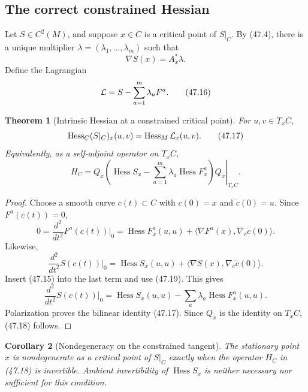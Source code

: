 \documentclass[11pt]{article}
\newtheorem{theorem}{Theorem}[section]
\newtheorem{corollary}[theorem]{Corollary}
\begin{document}
\subsection{The correct constrained Hessian}

Let \(S\in C^2(M)\), and suppose \(x\in C\) is a critical point of
\(S|_C\).  By (47.4), there is a unique multiplier
\(\lambda=(\lambda_1,\ldots,\lambda_m)\) such that
\[
                         \nabla S(x)=A_x^*\lambda.             \tag{47.15}
\]
Define the Lagrangian
\[
                        {\cal L}=S-\sum_{a=1}^m\lambda_aF^a.   \tag{47.16}
\]

\begin{theorem}[Intrinsic Hessian at a constrained critical point]
\label{thm:v11v47-constrained-hessian}
For \(u,v\in T_xC\),
\[
             \operatorname{Hess}_C(S|_C)_x(u,v)
             =\operatorname{Hess}_M{\cal L}_x(u,v).            \tag{47.17}
\]
Equivalently, as a self-adjoint operator on \(T_xC\),
\[
 H_C
 =\left.Q_x\left(\operatorname{Hess}S_x
       -\sum_{a=1}^m\lambda_a\operatorname{Hess}F^a_x\right)
                         Q_x\right|_{T_xC}.                    \tag{47.18}
\]
\end{theorem}

\begin{proof}
Choose a smooth curve \(c(t)\subset C\) with \(c(0)=x\) and
\(\dot c(0)=u\).  Since \(F^a(c(t))=0\),
\[
 0=\frac{d^2}{dt^2}F^a(c(t))\big|_{0}
   =\operatorname{Hess}F^a_x(u,u)
      +\langle\nabla F^a(x),\nabla_{\dot c}\dot c(0)\rangle.  \tag{47.19}
\]
Likewise,
\[
 \frac{d^2}{dt^2}S(c(t))\big|_0
 =\operatorname{Hess}S_x(u,u)
   +\langle\nabla S(x),\nabla_{\dot c}\dot c(0)\rangle.        \tag{47.20}
\]
Insert (47.15) into the last term and use (47.19).  This gives
\[
 \frac{d^2}{dt^2}S(c(t))\big|_0
 =\operatorname{Hess}S_x(u,u)
       -\sum_a\lambda_a\operatorname{Hess}F^a_x(u,u).         \tag{47.21}
\]
Polarization proves the bilinear identity (47.17).  Since \(Q_x\) is
the identity on \(T_xC\), (47.18) follows.
\end{proof}

\begin{corollary}[Nondegeneracy on the constrained tangent]
\label{cor:v11v47-nondegenerate}
The stationary point \(x\) is nondegenerate as a critical point of
\(S|_C\) exactly when the operator \(H_C\) in (47.18) is invertible.
Ambient invertibility of \(\operatorname{Hess}S_x\) is neither
necessary nor sufficient for this condition.
\end{corollary}
\end{document}
